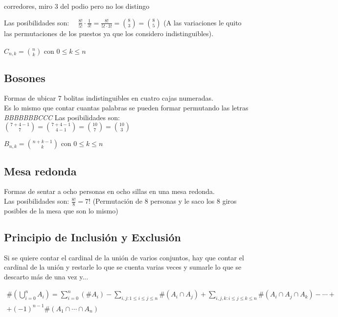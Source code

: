 \documentclass[a4paper,10pt]{article}
\begin{document}
 corredores, miro 3 del podio pero no los distingo

Las posibilidades son: \ \ $\frac{8!}{5!} \cdot \frac{1}{3!} = \frac{8!}{5! \cdot 3!} = \binom {8}{3} = \binom {8}{5}$ (A las variaciones le quito las permutaciones de los puestos ya que los considero indistinguibles). \\ \\

$C_{n,k} = \binom {n}{k} \mbox{ con } 0 \leq k \leq n$


\subsection{Bosones}

\ejemplo Formas de ubicar 7 bolitas indistinguibles en cuatro cajas numeradas. \\
Es lo mismo que contar cuantas palabras se pueden formar permutando las letras \textit{BBBBBBBCCC}
Las posibilidades son: \ $\binom {7+4-1}{7} = \binom {7+4-1} {4-1} = \binom {10}{7} = \binom {10}{3}$

$B_{n,k} = \binom {n+k-1}{k} \mbox{ con } 0 \leq k \leq n$


\subsection{Mesa redonda}


\ejemplo Formas de sentar a ocho personas en ocho sillas en una mesa redonda. \\
Las posibilidades son: $\frac{8!}{8} = 7!$ (Permutación de 8 personas y le saco los 8 giros posibles de la mesa que son lo mismo)


\subsection{Principio de Inclusión y Exclusión}

Si se quiere contar el cardinal de la unión de varios conjuntos, hay que contar el cardinal de la unión y restarle lo que se cuenta varias veces y sumarle lo que se descarto más de una vez y...

\begin{equation}
  \begin{split}
    \#\left(\bigcup_{i=0}^{n} {A_i}\right) = \sum_{i=0}^{n} {\left(\#A_i\right)} - \sum_{i,j:1 \leq i \leq j \leq n} {\#\left(A_i \cap A_j\right)} + \sum_{i,j,k: i \leq j \leq k \leq n} {\# \left(A_i \cap A_j \cap A_k \right)} - \cdots + \\ 
    + \left(-1\right)^{n-1} \# \left( A_1 \cap \cdots \cap A_n \right)
  \end{split}
\end{equation} 
\end{document}
